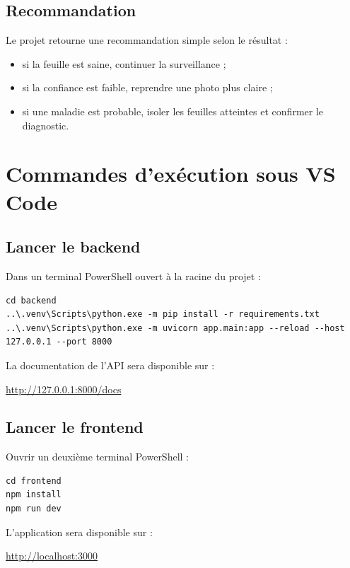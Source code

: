 \documentclass[12pt,a4paper]{report}
\begin{document}
\section{Recommandation}
Le projet retourne une recommandation simple selon le résultat :
\begin{itemize}
  \item si la feuille est saine, continuer la surveillance ;
  \item si la confiance est faible, reprendre une photo plus claire ;
  \item si une maladie est probable, isoler les feuilles atteintes et confirmer le diagnostic.
\end{itemize}

\chapter{Commandes d'exécution sous VS Code}

\section{Lancer le backend}
Dans un terminal PowerShell ouvert à la racine du projet :

\begin{lstlisting}[caption={Commandes pour lancer le backend}]
cd backend
..\.venv\Scripts\python.exe -m pip install -r requirements.txt
..\.venv\Scripts\python.exe -m uvicorn app.main:app --reload --host 127.0.0.1 --port 8000
\end{lstlisting}

La documentation de l'API sera disponible sur :

\begin{center}
\url{http://127.0.0.1:8000/docs}
\end{center}

\section{Lancer le frontend}
Ouvrir un deuxième terminal PowerShell :

\begin{lstlisting}[caption={Commandes pour lancer le frontend}]
cd frontend
npm install
npm run dev
\end{lstlisting}

L'application sera disponible sur :

\begin{center}
\url{http://localhost:3000}
\end{center}
\end{document}

